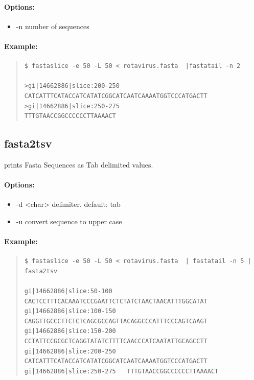 \documentclass[12pt]{article}
\begin{document}
\paragraph{Options:}
\begin{itemize}
\item-n number of sequences
\end{itemize}
\paragraph{Example:}
\begin{quote}
\begin{verbatim}
$ fastaslice -e 50 -L 50 < rotavirus.fasta  |fastatail -n 2

>gi|14662886|slice:200-250
CATCATTTCATACCATCATATCGGCATCAATCAAAATGGTCCCATGACTT
>gi|14662886|slice:250-275
TTTGTAACCGGCCCCCCTTAAAACT
\end{verbatim}
\end{quote}

\subsection{fasta2tsv}
prints Fasta Sequences as Tab delimited values.
\paragraph{Options:}
\begin{itemize}
\item-d <char> delimiter. default: tab
\item-u convert sequence to upper case
\end{itemize}
\paragraph{Example:}
\begin{quote}
\begin{verbatim}
$ fastaslice -e 50 -L 50 < rotavirus.fasta  | fastatail -n 5 | fasta2tsv 

gi|14662886|slice:50-100	CACTCCTTTCACAAATCCCGAATTCTCTATCTAACTAACATTTGGCATAT
gi|14662886|slice:100-150	CAGGTTGCCCTTCTCTCAGCGCCAGTTACAGGCCCATTTCCCAGTCAAGT
gi|14662886|slice:150-200	CCTATTCCGCGCTCAGGTATATCTTTTCAACCCATCAATATTGCAGCCTT
gi|14662886|slice:200-250	CATCATTTCATACCATCATATCGGCATCAATCAAAATGGTCCCATGACTT
gi|14662886|slice:250-275	TTTGTAACCGGCCCCCCTTAAAACT
\end{verbatim}
\end{quote}
\end{document}
